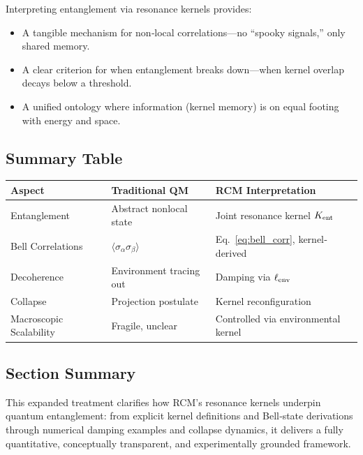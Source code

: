 Interpreting entanglement via resonance kernels provides:
\begin{itemize}
  \item A tangible mechanism for non‐local correlations—no “spooky signals,” only shared memory.
  \item A clear criterion for when entanglement breaks down—when kernel overlap decays below a threshold.
  \item A unified ontology where information (kernel memory) is on equal footing with energy and space.
\end{itemize}

\subsection{Summary Table}

\begin{center}
\begin{tabular}{|l|l|l|}
\hline
\textbf{Aspect}          & \textbf{Traditional QM}           & \textbf{RCM Interpretation}                 \\ \hline
Entanglement             & Abstract nonlocal state           & Joint resonance kernel \(K_{\rm ent}\)      \\ \hline
Bell Correlations        & \(\langle\sigma_\alpha\sigma_\beta\rangle\) & Eq.~\eqref{eq:bell_corr}, kernel‐derived \\ \hline
Decoherence              & Environment tracing out           & Damping via \(\ell_{\rm env}\)              \\ \hline
Collapse                 & Projection postulate              & Kernel reconfiguration                      \\ \hline
Macroscopic Scalability  & Fragile, unclear                  & Controlled via environmental kernel         \\ \hline
\end{tabular}
\end{center}

\subsection{Section Summary}

This expanded treatment clarifies how RCM’s resonance kernels underpin quantum entanglement: from explicit kernel definitions and Bell‐state derivations through numerical damping examples and collapse dynamics, it delivers a fully quantitative, conceptually transparent, and experimentally grounded framework.



